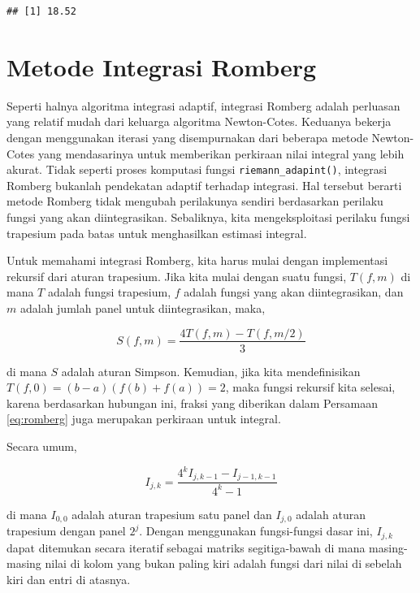 \documentclass[]{book}
\theoremstyle{definition}
\theoremstyle{definition}
\theoremstyle{definition}
\theoremstyle{remark}
\begin{document}
\begin{verbatim}
## [1] 18.52
\end{verbatim}

\hypertarget{romberg}{%
\section{Metode Integrasi Romberg}\label{romberg}}

Seperti halnya algoritma integrasi adaptif, integrasi Romberg adalah perluasan yang relatif mudah dari keluarga algoritma Newton-Cotes. Keduanya bekerja dengan menggunakan iterasi yang disempurnakan dari beberapa metode Newton-Cotes yang mendasarinya untuk memberikan perkiraan nilai integral yang lebih akurat. Tidak seperti proses komputasi fungsi \texttt{riemann\_adapint()}, integrasi Romberg bukanlah pendekatan adaptif terhadap integrasi. Hal tersebut berarti metode Romberg tidak mengubah perilakunya sendiri berdasarkan perilaku fungsi yang akan diintegrasikan. Sebaliknya, kita mengeksploitasi perilaku fungsi trapesium pada batas untuk menghasilkan estimasi integral.

Untuk memahami integrasi Romberg, kita harus mulai dengan implementasi rekursif dari aturan trapesium. Jika kita mulai dengan suatu fungsi, \(T\left(f, m\right)\) di mana \(T\) adalah fungsi trapesium, \(f\) adalah fungsi yang akan diintegrasikan, dan \(m\) adalah jumlah panel untuk diintegrasikan, maka,

\begin{equation}
S\left(f, m\right)=\frac{4T\left(f, m\right)-T\left(f, m/2\right)}{3}
  \label{eq:romberg}
\end{equation}

di mana \(S\) adalah aturan Simpson. Kemudian, jika kita mendefinisikan \(T \left(f, 0\right) = \left(b − a\right) \left(f \left(b\right) + f \left(a\right)\right) = 2\), maka fungsi rekursif kita selesai, karena berdasarkan hubungan ini, fraksi yang diberikan dalam Persamaan \eqref{eq:romberg} juga merupakan perkiraan untuk integral.

Secara umum,

\begin{equation}
I_{j,k}=\frac{4^k I_{j,k-1}-I_{j-1,k-1}}{4^k-1}
  \label{eq:romberg2}
\end{equation}

di mana \(I_{0, 0}\) adalah aturan trapesium satu panel dan \(I_{j, 0}\) adalah aturan trapesium dengan panel \(2^j\). Dengan menggunakan fungsi-fungsi dasar ini, \(I_{j, k}\) dapat ditemukan secara iteratif sebagai matriks segitiga-bawah di mana masing-masing nilai di kolom yang bukan paling kiri adalah fungsi dari nilai di sebelah kiri dan entri di atasnya.
\end{document}

